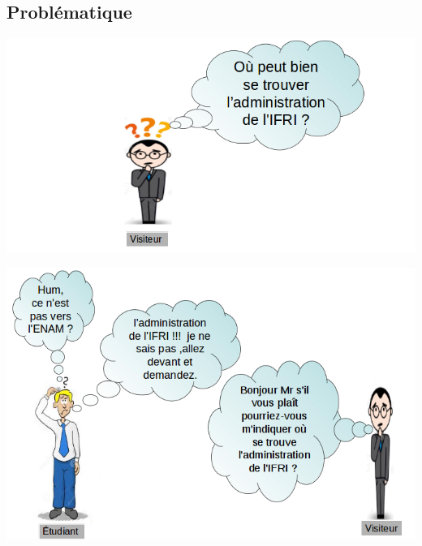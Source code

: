 \documentclass[11pt,handout]{beamer}
\begin{document}
		\subsection{Problématique}
			\begin{frame}
			    \includegraphics[scale=0.5]{images/problematique_1.png}
			\end{frame}
			\begin{frame}
			    \includegraphics[scale=0.45]{images/preuve_2.png}
			\end{frame}
\end{document}

